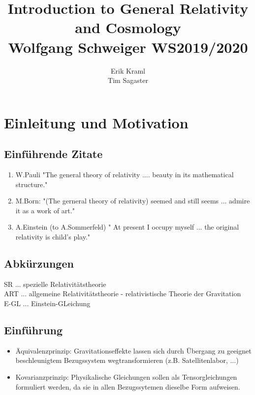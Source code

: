 \documentclass[a4paper, 11pt]{article}
\begin{document}
\title{Introduction to General Relativity and Cosmology\\\small{Wolfgang Schweiger WS2019/2020}}
\author{Erik Kraml \\ Tim Sagaster}
\maketitle
\newpage
\tableofcontents
\newpage


\setcounter{section}{-1}
\section{Einleitung und Motivation}
\subsection*{Einführende Zitate}
\begin{enumerate}
\item W.Pauli "The general theory of relativity ....  beauty in its mathematical structure."
\item M.Born: "(The gerneral theory of relativity) seemed and still seems ... admire it as a work of art."
\item A.Einstein (to A.Sommerfeld) " At present I occupy myself ... the original relativity is child's play."

\end{enumerate}

\subsection*{Abkürzungen}
SR ... spezielle Relativitätstheorie \\
ART ... allgemeine Relativitätstheorie - relativistische Theorie der Gravitation\\
E-GL ... Einstein-GLeichung

\subsection*{Einführung}
\begin{itemize}
\item Äquivalenzprinzip: Gravitationseffekte lassen sich durch Übergang zu geeignet beschleunigtem Bezugssystem wegtransformieren (z.B. Satellitenlabor, ...)

\item Kovarianzprinzip: Physikalische Gleichungen sollen als Tensorgleichungen formuliert werden, da sie in allen Bezugssytemen dieselbe Form aufweisen.
\end{itemize}
\end{document}
